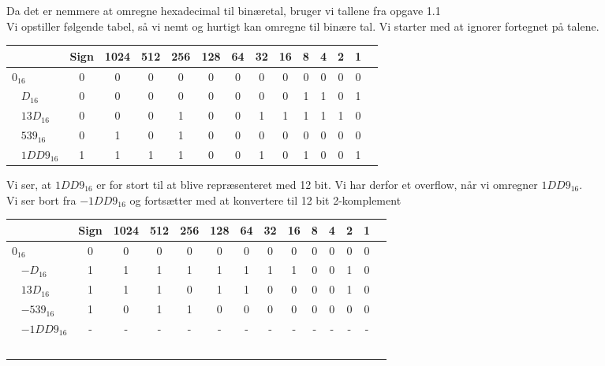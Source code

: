 \documentclass[a4paper,11pt]{article}
\begin{document}
Da det er nemmere at omregne hexadecimal til binæretal, bruger vi tallene fra opgave 1.1\\
Vi opstiller følgende tabel, så vi nemt og hurtigt kan omregne til binære tal. Vi starter med at ignorer fortegnet på talene.
\begin{center}
  \begin{tabular}{ | l | c | c | c |  c |  c |  c |  c |  c |  c |  c |  c |  c |  c | }
    \hline
    & Sign & 1024 & 512 & 256 & 128 & 64 & 32 & 16 & 8 & 4 & 2 & 1\\ \hline
    $0_{16}$ & 0 & 0 & 0 & 0 & 0 & 0 & 0 & 0 & 0 & 0 & 0 & 0 \\ \hline
    $D_{16}$ & 0 & 0 & 0 & 0 & 0 & 0 & 0 & 0 & 1 & 1 & 0 & 1 \\ \hline
    $13D_{16}$&0&0&0&1&0&0&1&1&1&1&1&0 \\ \hline
    $539_{16}$ & 0 & 1 & 0 & 1 & 0 & 0 & 0 & 0 & 0 & 0 & 0 & 0 \\ \hline
    $1DD9_{16}$ & 1 & 1 & 1 & 1 & 0 & 0 & 1 & 0 & 1 & 0 & 0 & 1 \\
    \hline
  \end{tabular}
\end{center}

Vi ser, at  $1DD9_{16}$ er for stort til at blive repræsenteret med 12 bit. Vi har derfor et overflow, når vi omregner  $1DD9_{16}$.\\

Vi ser bort fra $-1DD9_{16}$ og fortsætter med at konvertere til 12 bit 2-komplement
\begin{center}
  \begin{tabular}{ | l | c | c | c |  c |  c |  c |  c |  c |  c |  c |  c |  c |  c | }
   \hline
    & Sign & 1024 & 512 & 256 & 128 & 64 & 32 & 16 & 8 & 4 & 2 & 1\\ \hline
    $0_{16}$ & 0 & 0 & 0 & 0 & 0 & 0 & 0 & 0 & 0 & 0 & 0 & 0 \\ \hline
    $-D_{16}$ & 1 & 1 & 1 & 1 & 1 & 1 & 1 & 1 & 0 & 0 & 1 & 0 \\ \hline
    $13D_{16}$&1&1&1&0&1&1&0&0&0&0&1&0 \\ \hline
    $-539_{16}$ & 1 & 0 & 1 & 1 & 0 & 0 & 0 & 0 & 0 & 0 & 0 & 0 \\ \hline
    $-1DD9_{16}$ & - & - & - & - & - & - & - & - & - & - & - & - \\ \hline
  \end{tabular}
\end{center}
\end{document}
